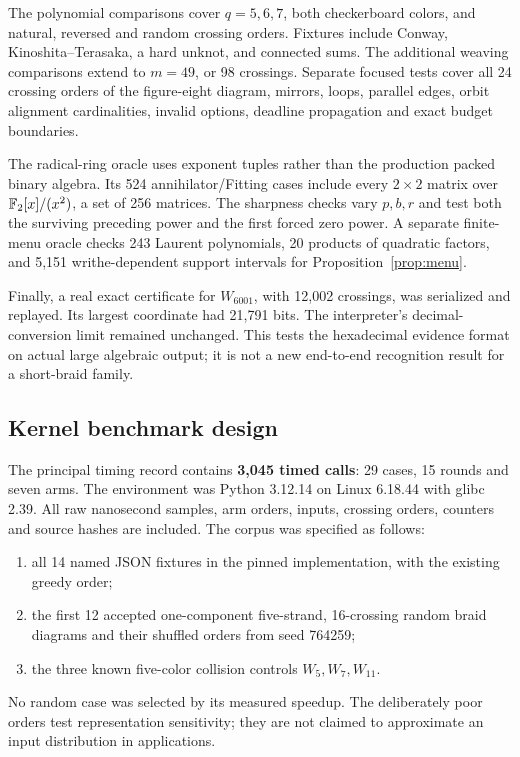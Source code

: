 The polynomial comparisons cover $q=5,6,7$, both checkerboard colors, and
natural, reversed and random crossing orders. Fixtures include Conway,
Kinoshita--Terasaka, a hard unknot, and connected sums. The additional
weaving comparisons extend to $m=49$, or 98 crossings.
Separate focused tests cover all 24 crossing orders of the figure-eight
diagram, mirrors, loops, parallel edges, orbit alignment cardinalities,
invalid options, deadline propagation and exact budget boundaries.

The radical-ring oracle uses exponent tuples rather than the production
packed binary algebra. Its 524 annihilator/Fitting cases include every
$2\times2$ matrix over $\mathbb F_2[x]/(x^2)$, a set of 256 matrices.
The sharpness checks vary $p,b,r$ and test both the surviving preceding
power and the first forced zero power. A separate finite-menu oracle checks
243 Laurent polynomials, 20 products of quadratic factors, and 5,151
writhe-dependent support intervals for Proposition~\ref{prop:menu}.

Finally, a real exact certificate for $W_{6001}$, with 12,002 crossings,
was serialized and replayed. Its largest coordinate had 21,791 bits.
The interpreter's decimal-conversion limit remained unchanged. This tests
the hexadecimal evidence format on actual large algebraic output; it is not
a new end-to-end recognition result for a short-braid family.

\subsection{Kernel benchmark design}

The principal timing record contains \textbf{3,045 timed calls}: 29 cases,
15 rounds and seven arms. The environment was Python 3.12.14 on Linux
6.18.44 with glibc 2.39. All raw nanosecond samples, arm orders,
inputs, crossing orders, counters and source hashes are included.
The corpus was specified as follows:
\begin{enumerate}
\item all 14 named JSON fixtures in the pinned implementation, with the
existing greedy order;
\item the first 12 accepted one-component five-strand, 16-crossing random
braid diagrams and their shuffled orders from seed 764259;
\item the three known five-color collision controls $W_5,W_7,W_{11}$.
\end{enumerate}
No random case was selected by its measured speedup.
The deliberately poor orders test representation sensitivity; they are not
claimed to approximate an input distribution in applications.


